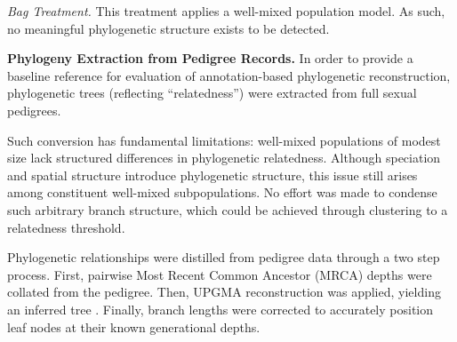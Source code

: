 \textit{Bag Treatment.}
This treatment applies a well-mixed population model.
As such, no meaningful phylogenetic structure exists to be detected.

\textbf{Phylogeny Extraction from Pedigree Records.}
In order to provide a baseline reference for evaluation of annotation-based phylogenetic reconstruction, phylogenetic trees (reflecting ``relatedness'') were extracted from full sexual pedigrees.

Such conversion has fundamental limitations: well-mixed populations of modest size lack structured differences in phylogenetic relatedness.
Although speciation and spatial structure introduce phylogenetic structure, this issue still arises among constituent well-mixed subpopulations.
No effort was made to condense such arbitrary branch structure, which could be achieved through clustering to a relatedness threshold.

Phylogenetic relationships were distilled from pedigree data through a two step process.
First, pairwise Most Recent Common Ancestor (MRCA) depths were collated from the pedigree.
Then, UPGMA reconstruction was applied, yielding an inferred tree \citep{sokal1958university}.
Finally, branch lengths were corrected to accurately position leaf nodes at their known generational depths.
